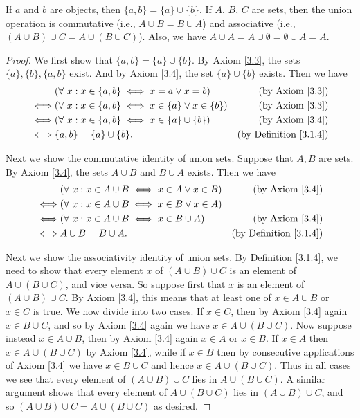 \begin{lemma}\label{3.1.13}
If \(a\) and \(b\) are objects, then \(\{a, b\} = \{a\} \cup \{b\}\).
If \(A\), \(B\), \(C\) are sets, then the union operation is commutative (i.e., \(A \cup B = B \cup A\)) and associative (i.e., \((A \cup B) \cup C = A \cup (B \cup C)\)).
Also, we have \(A \cup A = A \cup \emptyset = \emptyset \cup A = A\).
\end{lemma}

\begin{proof}
We first show that \(\{a, b\} = \{a\} \cup \{b\}\).
By Axiom \ref{3.3}, the sets \(\{a\}, \{b\}, \{a, b\}\) exist.
And by Axiom \ref{3.4}, the set \(\{a\} \cup \{b\}\) exists.
Then we have
\begin{align*}
& (\forall\ x : x \in \{a, b\} \iff x = a \lor x = b) & \text{(by Axiom \ref{3.3})} \\
\iff & (\forall\ x : x \in \{a, b\} \iff x \in \{a\} \lor x \in \{b\}) & \text{(by Axiom \ref{3.3})} \\
\iff & (\forall\ x : x \in \{a, b\} \iff x \in \{a\} \cup \{b\}) & \text{(by Axiom \ref{3.4})} \\
\iff & \{a, b\} = \{a\} \cup \{b\}. & \text{(by Definition \ref{3.1.4})}
\end{align*}

Next we show the commutative identity of union sets.
Suppose that \(A, B\) are sets.
By Axiom \ref{3.4}, the sets \(A \cup B\) and \(B \cup A\) exists.
Then we have
\begin{align*}
& (\forall\ x : x \in A \cup B \iff x \in A \lor x \in B) & \text{(by Axiom \ref{3.4})} \\
\iff & (\forall\ x : x \in A \cup B \iff x \in B \lor x \in A) \\
\iff & (\forall\ x : x \in A \cup B \iff x \in B \cup A) & \text{(by Axiom \ref{3.4})} \\
\iff & A \cup B = B \cup A. & \text{(by Definition \ref{3.1.4})}
\end{align*}

Next we show the associativity identity of union sets.
By Definition \ref{3.1.4}, we need to show that every element \(x\) of \((A \cup B) \cup C\) is an element of \(A \cup (B \cup C)\), and vice versa.
So suppose first that \(x\) is an element of \((A \cup B) \cup C\).
By Axiom \ref{3.4}, this means that at least one of \(x \in A \cup B\) or \(x \in C\) is true.
We now divide into two cases.
If \(x \in C\), then by Axiom \ref{3.4} again \(x \in B \cup C\), and so by Axiom \ref{3.4} again we have \(x \in A \cup (B \cup C)\).
Now suppose instead \(x \in A \cup B\), then by Axiom \ref{3.4} again \(x \in A\) or \(x \in B\).
If \(x \in A\) then \(x \in A \cup (B \cup C)\) by Axiom \ref{3.4}, while if \(x \in B\) then by consecutive applications of Axiom \ref{3.4} we have \(x \in B \cup C\) and hence \(x \in A \cup (B \cup C)\).
Thus in all cases we see that every element of \((A \cup B) \cup C\) lies in \(A \cup (B \cup C)\).
A similar argument shows that every element of \(A \cup (B \cup C)\) lies in \((A \cup B) \cup C\), and so \((A \cup B) \cup C = A \cup (B \cup C) \) as desired.


\end{proof}
